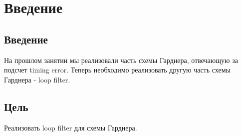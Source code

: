 \chapter{Введение}
\label{ch:intro}

\section{Введение} 

На прошлом занятии мы реализовали часть схемы Гарднера, отвечающую за подсчет timing error. Теперь необходимо реализовать другую часть
схемы Гарднера - loop filter.

\section{Цель} 

Реализовать loop filter для схемы Гарднера.

\endinput